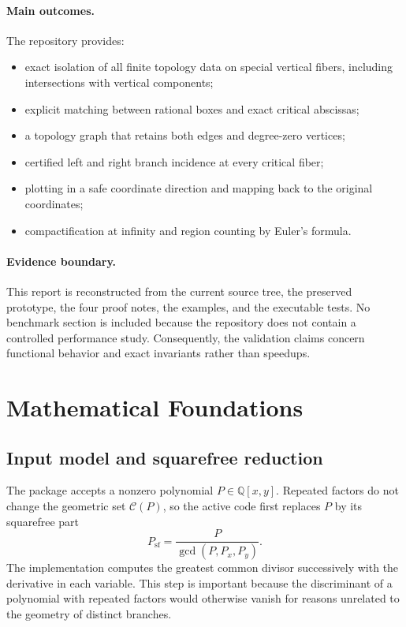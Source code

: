 \documentclass[11pt,a4paper]{article}
\newcommand{\QQ}{\mathbb{Q}}
\newcommand{\Curve}{\mathcal{C}}
\begin{document}
\paragraph{Main outcomes.}
The repository provides:
\begin{itemize}
  \item exact isolation of all finite topology data on special vertical
        fibers, including intersections with vertical components;
  \item explicit matching between rational boxes and exact critical
        abscissas;
  \item a topology graph that retains both edges and degree-zero vertices;
  \item certified left and right branch incidence at every critical fiber;
  \item plotting in a safe coordinate direction and mapping back to the
        original coordinates;
  \item compactification at infinity and region counting by Euler's formula.
\end{itemize}

\paragraph{Evidence boundary.}
This report is reconstructed from the current source tree, the preserved
prototype, the four proof notes, the examples, and the executable tests. No
benchmark section is included because the repository does not contain a
controlled performance study. Consequently, the validation claims concern
functional behavior and exact invariants rather than speedups.


\section{Mathematical Foundations}

\subsection{Input model and squarefree reduction}

The package accepts a nonzero polynomial $P\in\QQ[x,y]$. Repeated factors do
not change the geometric set $\Curve(P)$, so the active code first replaces
$P$ by its squarefree part
\[
  P_{\mathrm{sf}}
  =\frac{P}{\gcd(P,P_x,P_y)}.
\]
The implementation computes the greatest common divisor successively with
the derivative in each variable. This step is important because the
discriminant of a polynomial with repeated factors would otherwise vanish for
reasons unrelated to the geometry of distinct branches.
\end{document}
